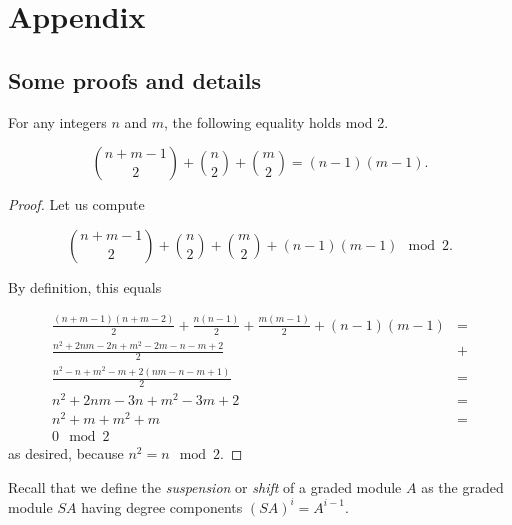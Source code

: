 \documentclass[Thesis.tex]{subfiles}
\begin{document}
\chapter*{Appendix}
\appendix
\gdef\thesection{\Alph{section}}
\section{Some proofs and details}\label{AppA}



\begin{lem}\label{binom}
For any integers $n$ and $m$, the following equality holds mod 2.

\[\binom{n+m-1}{2}+\binom{n}{2}+\binom{m}{2}=(n-1)(m-1).\]
\end{lem}
\begin{proof}
Let us compute 

\[\binom{n+m-1}{2}+\binom{n}{2}+\binom{m}{2}+(n-1)(m-1)\mod 2.\]

By definition, this equals

\begin{align*}
\frac{(n+m-1)(n+m-2)}{2}+\frac{n(n-1)}{2}+\frac{m(m-1)}{2}+(n-1)(m-1)&=\\
\frac{n^2+2nm-2n+m^2-2m-n-m+2}{2}&+\\
\frac{n^2-n+m^2-m+2(nm-n-m+1)}{2}&=\\
n^2+2nm-3n+m^2-3m+2&=\\
n^2+m+m^2+m&=\\
0\mod 2
\end{align*}
as desired, because $n^2=n\mod 2$.


\end{proof}




Recall that we define the \emph{suspension} or \emph{shift} of a graded module $A$ as the graded module $S A$ having degree components $(S A)^i=A^{i-1}$.
\end{document}
